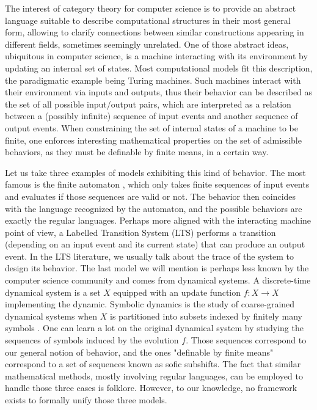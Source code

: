 The interest of category theory for computer science is to provide an abstract language suitable to describe computational structures in their most general form, allowing to clarify connections between similar constructions appearing in different fields, sometimes seemingly unrelated. 
One of those abstract ideas, ubiquitous in computer science, is a machine interacting with its environment by updating an internal set of states. 
Most computational models fit this description, the paradigmatic example being Turing machines. 
Such machines interact with their environment via inputs and outputs, thus their behavior can be described as the set of all possible input/output pairs, which are interpreted as a relation between a (possibly infinite) sequence of input events and another sequence of output events. 
When constraining the set of internal states of a machine to be finite, one enforces interesting mathematical properties on the set of admissible behaviors, as they must be definable by finite means, in a certain way.

Let us take three examples of models exhibiting this kind of behavior. 
The most famous is the finite automaton \cite{DBLP:books/daglib/0086373,DBLP:books/daglib/0016921}, which only takes finite sequences of input events and evaluates if those sequences are valid or not.
The behavior then coincides with the language recognized by the automaton, and the possible behaviors are exactly the regular languages.
Perhaps more aligned with the interacting machine point of view, a Labelled Transition System (LTS) performs a transition (depending on an input event and its current state) that can produce an output event. In the LTS literature, we usually talk about the trace of the system to design its behavior.
The last model we will mention is perhaps less known by the computer science community and comes from dynamical systems.
A discrete-time dynamical system is a set $X$ equipped with an update function $f:X\to X$ implementing the dynamic. 
Symbolic dynamics is the study of coarse-grained dynamical systems when $X$ is partitioned into subsets indexed by finitely many symbols \cite{lind-marcus}. 
One can learn a lot on the original dynamical system by studying the sequences of symbols induced by the evolution $f$.
Those sequences correspond to our general notion of behavior, and the ones "definable by finite means" correspond to a set of sequences known as sofic subshifts.
The fact that similar mathematical methods, mostly involving regular languages, can be employed to handle those three cases is folklore. 
However, to our knowledge, no framework exists to formally unify those three models.

